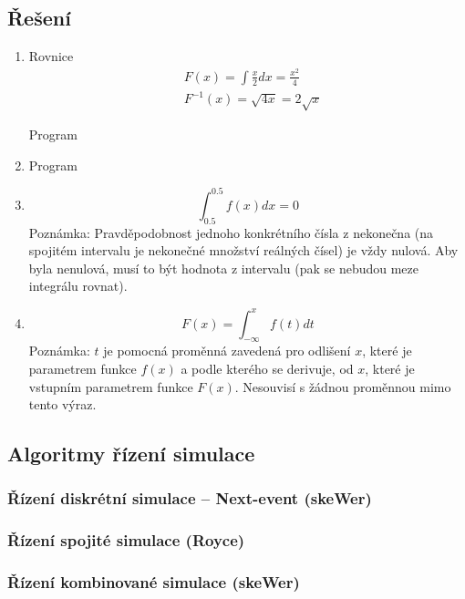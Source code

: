\documentclass[11pt]{article} %
\begin{document}


\subsection*{Řešení}

\begin{enumerate}
\item
Rovnice
\begin{align}
&F(x) = \int \frac{x}{2} dx = \frac{x^2}{4} \\
&F^{-1}(x) = \sqrt{4x} = 2 \sqrt{x}
\end{align}

Program


\item

Program


\item
$$\int_{0.5}^{0.5} f(x) dx = 0$$
Poznámka: Pravděpodobnost jednoho konkrétního čísla z nekonečna (na spojitém intervalu je nekonečné množství reálných čísel) je vždy nulová. Aby byla nenulová, musí to být hodnota z intervalu (pak se nebudou meze integrálu rovnat).

\item
$$F(x) = \int_{-\infty}^{x}f(t)dt$$
Poznámka: $t$ je pomocná proměnná zavedená pro odlišení $x$, které je parametrem funkce $f(x)$ a podle kterého se derivuje, od $x$, které je vstupním parametrem funkce $F(x)$. Nesouvisí s žádnou proměnnou mimo tento výraz.
\end{enumerate}


\subsection{Algoritmy řízení simulace}
\subsubsection{Řízení diskrétní simulace -- Next-event (skeWer)}


\subsubsection{Řízení spojité simulace (Royce)}


\subsubsection{Řízení kombinované simulace (skeWer)}

\end{document}
